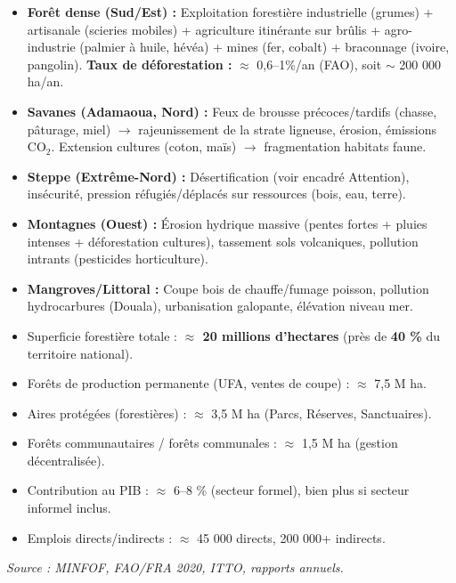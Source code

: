 \documentclass[11pt]{article}
\begin{document}
\begin{aretenir}
\begin{itemize}
    \item \textbf{Forêt dense (Sud/Est) :} Exploitation forestière industrielle (grumes) + artisanale (scieries mobiles) + agriculture itinérante sur brûlis + agro-industrie (palmier à huile, hévéa) + mines (fer, cobalt) + braconnage (ivoire, pangolin). \textbf{Taux de déforestation :} $\approx$ 0,6--1\%/an (FAO), soit $\sim$ 200 000 ha/an.
    \item \textbf{Savanes (Adamaoua, Nord) :} Feux de brousse précoces/tardifs (chasse, pâturage, miel) $\rightarrow$ rajeunissement de la strate ligneuse, érosion, émissions CO$_2$. Extension cultures (coton, maïs) $\rightarrow$ fragmentation habitats faune.
    \item \textbf{Steppe (Extrême-Nord) :} Désertification (voir encadré Attention), insécurité, pression réfugiés/déplacés sur ressources (bois, eau, terre).
    \item \textbf{Montagnes (Ouest) :} Érosion hydrique massive (pentes fortes + pluies intenses + déforestation cultures), tassement sols volcaniques, pollution intrants (pesticides horticulture).
    \item \textbf{Mangroves/Littoral :} Coupe bois de chauffe/fumage poisson, pollution hydrocarbures (Douala), urbanisation galopante, élévation niveau mer.
\end{itemize}
\end{aretenir}

\begin{exemplebox}
\begin{itemize}
    \item Superficie forestière totale : \textbf{$\approx$ 20 millions d'hectares} (près de \textbf{40 \%} du territoire national).
    \item Forêts de production permanente (UFA, ventes de coupe) : $\approx$ 7,5 M ha.
    \item Aires protégées (forestières) : $\approx$ 3,5 M ha (Parcs, Réserves, Sanctuaires).
    \item Forêts communautaires / forêts communales : $\approx$ 1,5 M ha (gestion décentralisée).
    \item Contribution au PIB : $\approx$ 6--8 \% (secteur formel), bien plus si secteur informel inclus.
    \item Emplois directs/indirects : $\approx$ 45 000 directs, 200 000+ indirects.
\end{itemize}
\emph{Source : MINFOF, FAO/FRA 2020, ITTO, rapports annuels.}
\end{exemplebox}
\end{document}
